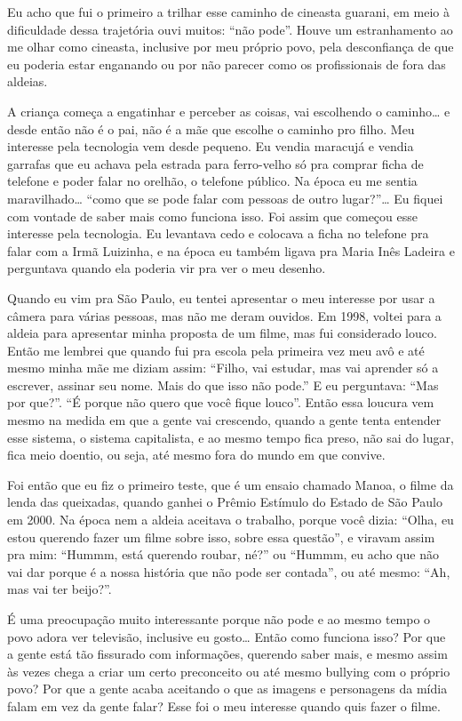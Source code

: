 Eu acho que fui o primeiro a trilhar esse caminho de cineasta guarani,
em meio à dificuldade dessa trajetória ouvi muitos: ``não pode''. Houve
um estranhamento ao me olhar como cineasta, inclusive por meu próprio
povo, pela desconfiança de que eu poderia estar enganando ou por não
parecer como os profissionais de fora das aldeias.

A criança começa a engatinhar e perceber as coisas, vai escolhendo o
caminho\ldots{} e desde então não é o pai, não é a mãe que escolhe o caminho
pro filho. Meu interesse pela tecnologia vem desde pequeno. Eu vendia
maracujá e vendia garrafas que eu achava pela estrada para ferro-velho
só pra comprar ficha de telefone e poder falar no orelhão, o telefone
público. Na época eu me sentia maravilhado\ldots{} ``como que se pode falar
com pessoas de outro lugar?''\ldots{} Eu fiquei com vontade de saber mais
como funciona isso. Foi assim que começou esse interesse pela
tecnologia. Eu levantava cedo e colocava a ficha no telefone pra falar
com a Irmã Luizinha, e na época eu também ligava pra Maria Inês Ladeira
e perguntava quando ela poderia vir pra ver o meu desenho. 

Quando eu vim pra São Paulo, eu tentei apresentar o meu interesse por
usar a câmera para várias pessoas, mas não me deram ouvidos. Em 1998,
voltei para a aldeia para apresentar minha proposta de um filme, mas
fui considerado louco. Então me lembrei que quando fui pra escola pela
primeira vez meu avô e até mesmo minha mãe me diziam assim: ``Filho, vai
estudar, mas vai aprender só a escrever, assinar seu nome. Mais do que
isso não pode.'' E eu perguntava: ``Mas por que?''. ``É porque não quero
que você fique louco''. Então essa loucura vem mesmo na medida em que a
gente vai crescendo, quando a gente tenta entender esse sistema, o
sistema capitalista, e ao mesmo tempo fica preso, não sai do lugar,
fica meio doentio, ou seja, até mesmo fora do mundo em que convive. 

Foi então que eu fiz o primeiro teste, que é um ensaio chamado Manoa, o
filme da lenda das queixadas, quando ganhei o Prêmio Estímulo do Estado
de São Paulo em 2000. Na época nem a aldeia aceitava o trabalho, porque
você dizia: ``Olha, eu estou querendo fazer um filme sobre isso, sobre
essa questão'', e viravam assim pra mim: ``Hummm, está querendo roubar,
né?'' ou ``Hummm, eu acho que não vai dar porque é a nossa história que
não pode ser contada'', ou até mesmo: ``Ah, mas vai ter beijo?''.

É uma preocupação muito interessante porque não pode e ao mesmo tempo o
povo adora ver televisão, inclusive eu gosto\ldots{} Então como funciona
isso? Por que a gente está tão fissurado com informações, querendo
saber mais, e mesmo assim às vezes chega a criar um certo preconceito
ou até mesmo bullying com o próprio povo? Por que a gente acaba
aceitando o que as imagens e personagens da mídia falam em vez da gente
falar? Esse foi o meu interesse quando quis fazer o filme. 

